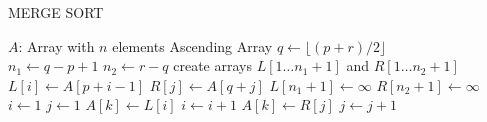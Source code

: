 \documentclass{article}
\begin{document}
    \begin{CJK*}{UTF8}{gkai}
        \begin{algorithm}
            \caption{MERGE SORT}
            \begin{algorithmic}[1]
                \Require $A$: Array with $n$ elements
                \Ensure Ascending Array
                        \State $q \gets \lfloor (p+r)/2 \rfloor$
                        \State {}
                        \State {}
                        \State {}
                    \EndIf
                \EndFunction
                \\
                    \State $n_1 \gets q - p + 1$
                    \State $n_2 \gets r - q$
                    \State create arrays $L[1 \dots n_1 + 1]$ and $R[1 \dots n_2 + 1]$
                        \State $L[i] \gets A[p+i-1]$
                    \EndFor
                        \State $R[j] \gets A[q+j]$
                    \EndFor
                    \State $L[n_1 + 1] \gets \infty$
                    \State $R[n_2 + 1] \gets \infty$
                    \State $i \gets 1$
                    \State $j \gets 1$
                            \State $A[k] \gets L[i]$
                            \State $i \gets i + 1$
                        \Else
                            \State $A[k] \gets R[j]$
                            \State $j \gets j + 1$
                        \EndIf
                    \EndFor
                \EndFunction
            \end{algorithmic}
        \end{algorithm}
    \end{CJK*}
\end{document}
